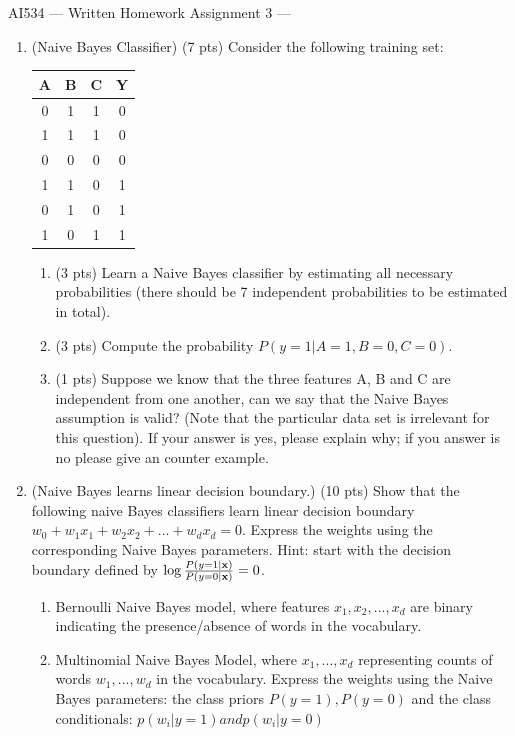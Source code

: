 \documentclass{article}
\def\x{{\bf x}}
\begin{document}
{\Large
\begin{center}
AI534 --- Written Homework Assignment 3 ---
\end{center}
}
\begin{enumerate}
\item (Naive Bayes Classifier) (7 pts) Consider the following training set:
\begin{center}
\begin{tabular}{|c|c|c|c|}\hline
A&B&C&Y\\ \hline
0&1&1&0 \\ \hline
1&1&1&0 \\ \hline
0&0&0&0 \\ \hline
1&1&0&1 \\ \hline
0&1&0&1 \\ \hline
1&0&1&1 \\ \hline
\end{tabular}
\end{center}
\begin{enumerate}
\item (3 pts) Learn a Naive Bayes classifier by estimating
all necessary probabilities (there should be 7 independent probabilities to be estimated in total).

\item (3 pts) Compute the probability $P(y=1|A=1, B=0, C=0)$.

\item (1 pts) Suppose we know that the three features A, B and C are independent from one another, can we say that the Naive Bayes assumption is valid? (Note that the particular data set is irrelevant for this question). If your answer is yes, please explain why; if you answer is no please give an counter example.


\end{enumerate}

\item (Naive Bayes learns linear decision boundary.) (10 pts) Show that the following naive Bayes classifiers learn linear decision boundary $w_0+w_1x_1+w_2x_2+...+w_dx_d=0$. Express the weights using the corresponding Naive Bayes parameters. Hint: start with the decision boundary defined by $\log\frac{P(y=1|\x)}{P(y=0|\x)}=0$.

\begin{enumerate}
    \item Bernoulli Naive Bayes model, where features $x_1, x_2, ...,x_d$ are binary indicating the presence/absence of words in the vocabulary.\\   
\item Multinomial Naive Bayes Model, where $x_1, ..., x_d$ representing counts of words $w_1, ..., w_d$ in the vocabulary.  Express the weights using the Naive Bayes parameters: the class priors $P(y=1), P(y=0)$ and the class conditionals: $p(w_i|y=1) and p(w_i|y=0)$


\end{enumerate}
\end{enumerate}
\end{document}
